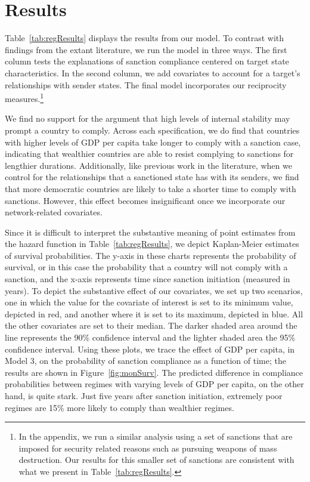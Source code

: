 \section*{Results}
\label{Results} 

Table~\ref{tab:regResults} displays the results from our model. To contrast with findings from the extant literature, we run the model in three ways. The first column tests the explanations of sanction compliance centered on target state characteristics. In the second column, we add covariates to account for a target's relationships with sender states. The final model incorporates our reciprocity measures.\footnote{In the appendix, we run a similar analysis using a set of sanctions that are imposed for security related reasons such as pursuing weapons of mass destruction. Our results for this smaller set of sanctions are consistent with what we present in Table~\ref{tab:regResults}.} 



We find no support for the argument that high levels of internal stability may prompt a country to comply. Across each specification, we do find that countries with higher levels of GDP per capita take longer to comply with a sanction case, indicating that wealthier countries are able to resist complying to sanctions for lengthier durations. Additionally, like previous work in the literature, when we control for the relationships that a sanctioned state has with its senders, we find that more democratic countries are likely to take a shorter time to comply with sanctions. However, this effect becomes insignificant once we incorporate our network-related covariates. 

Since it is difficult to interpret the substantive meaning of point estimates from the hazard function in Table~\ref{tab:regResults}, we depict Kaplan-Meier estimates of survival probabilities. The y-axis in these charts represents the probability of survival, or in this case the probability that a country will not comply with a sanction, and the x-axis represents time since sanction initiation (measured in years). To depict the substantive effect of our covariates, we set up two scenarios, one in which the value for the covariate of interest is set to its minimum value, depicted in red, and another where it is set to its maximum, depicted in blue. All the other covariates are set to their median. The darker shaded area around the line represents the 90\% confidence interval and the lighter shaded area the 95\% confidence interval. Using these plots, we trace the effect of GDP per capita, in Model 3, on the probability of sanction compliance as a function of time; the results are shown in Figure~\ref{fig:monSurv}. The predicted difference in compliance probabilities between regimes with varying levels of GDP per capita, on the other hand, is quite stark. Just five years after sanction initiation, extremely poor regimes are 15\% more likely to comply than wealthier regimes. 

